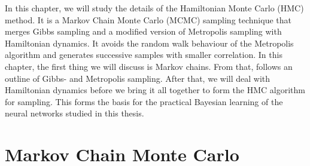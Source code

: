 In this chapter, we will study the details of the Hamiltonian Monte Carlo (HMC) method.
It is a Markov Chain Monte Carlo (MCMC) sampling technique that merges Gibbs sampling and a modified version of Metropolis sampling
with Hamiltonian dynamics. It avoids the random walk behaviour of the Metropolis algorithm
and generates successive samples with smaller correlation. In this chapter, the first thing we will discuss is Markov chains.
From that, follows an outline of Gibbs- and Metropolis sampling. After that, we will deal with Hamiltonian dynamics before we bring it all together
to form the HMC algorithm for sampling. This forms the basis for the practical Bayesian learning of the neural networks studied in this thesis.

\section{Markov Chain Monte Carlo}\label{sec:mcmc}
\begin{comment}
  The treatment of Markov chains largely follows the presentation in \cite{markov_chains}. A Markov process is a scheme that from a given state (or value) $\mu$ generates a new state $\nu$ with a \textit{transition} probability $T(\nu|\mu)$. A Markov process has the following properties
\begin{itemize}
  \item The transition probabilities $T(\nu|\mu)$ are time-independent.
  \item $T(\nu|\mu)$ only depend on the states $\mu$ and $\nu$.
  \item The transition $\mu \to \mu$ is allowed, thus $T(\mu|\mu) > 0$. Hence, the new generated state may just be the same as the previous state.
  \item The transition probabilties must sum to unity, hence $\int_{\nu} T(\nu|\mu) = 1$. In other words, the procedure must generate some new state.
\end{itemize}

Two important principles, originally found by Metropolis et. al \cite{metropolis}, were introduced to make the MCMC chains computationally feasible. 
\begin{enumerate}
  \item \textbf{Ergodicity}: Any state $\nu$ can be reached from any other state $\mu$ given a long enough MCMC chain.
  \item \textbf{Detailed balance}: If the transition probabilities $T(\nu|\mu)$ obey the detailed balance equation, $$P(\mu)T(\nu|\mu) = P(\nu)T(\mu|\nu),$$
      then the Markov chain is guaranteed to be ergodic. The interpretation of this is that on average, the system makes the transition $\mu \to \nu$ just as often as the transition $\nu \to \mu$.
\end{enumerate}
\end{comment}

